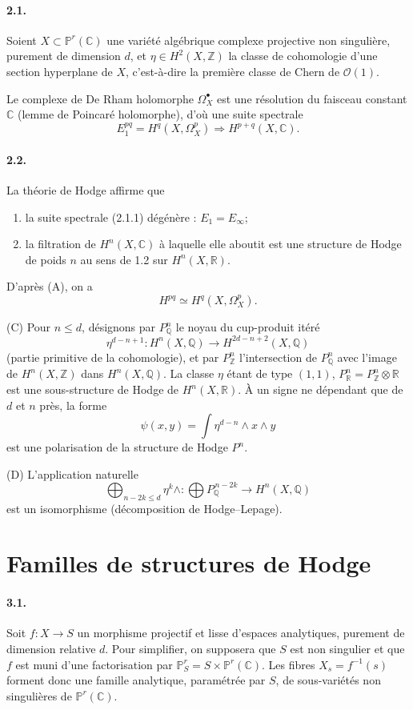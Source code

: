 \documentclass[10pt]{article}
\newcommand{\C}{\mathbb C}
\newcommand{\R}{\mathbb R}
\newcommand{\Z}{\mathbb Z}
\newcommand{\Q}{\mathbb Q}
\newcommand{\Pj}{\mathbb P}
\newcommand{\cO}{\mathcal O}
\theoremstyle{deligne}
\begin{document}
\paragraph{2.1.}
Soient $X\subset\Pj^r(\C)$ une variété algébrique complexe projective non singulière, purement de dimension $d$, et $\eta\in H^2(X,\Z)$ la classe de cohomologie d'une section hyperplane de $X$, c'est-à-dire la première classe de Chern de $\cO(1)$.

Le complexe de De Rham holomorphe $\Omega_X^\bullet$ est une résolution du faisceau constant $\C$ (lemme de Poincaré holomorphe), d'où une suite spectrale
\begin{equation}
E_1^{pq}=H^q(X,\Omega_X^p)\Rightarrow H^{p+q}(X,\C).
\tag{2.1.1}
\end{equation}

\paragraph{2.2.}
La théorie de Hodge affirme que
\begin{enumerate}[label=(\Alph*)]
\item la suite spectrale (2.1.1) dégénère : $E_1=E_\infty$;
\item la filtration de $H^n(X,\C)$ à laquelle elle aboutit est une structure de Hodge de poids $n$ au sens de 1.2 sur $H^n(X,\R)$.
\end{enumerate}
D'après (A), on a
\[
H^{pq}\simeq H^q(X,\Omega_X^p).
\]

(C) Pour $n\le d$, désignons par $P_\Q^n$ le noyau du cup-produit itéré
\[
\eta^{d-n+1}:H^n(X,\Q)\longrightarrow H^{2d-n+2}(X,\Q)
\]
(partie primitive de la cohomologie), et par $P_\Z^n$ l'intersection de $P_\Q^n$ avec l'image de $H^n(X,\Z)$ dans $H^n(X,\Q)$. La classe $\eta$ étant de type $(1,1)$, $P_\R^n=P_\Z^n\otimes\R$ est une sous-structure de Hodge de $H^n(X,\R)$. À un signe ne dépendant que de $d$ et $n$ près, la forme
\[
\psi(x,y)=\int \eta^{d-n}\wedge x\wedge y
\]
est une polarisation de la structure de Hodge $P^n$.

(D) L'application naturelle
\[
\bigoplus_{n-2k\le d}\eta^k\wedge:
\bigoplus P_\Q^{\,n-2k}\longrightarrow H^n(X,\Q)
\]
est un isomorphisme (décomposition de Hodge--Lepage).

\section{Familles de structures de Hodge}

\paragraph{3.1.}
Soit $f:X\to S$ un morphisme projectif et lisse d'espaces analytiques, purement de dimension relative $d$. Pour simplifier, on supposera que $S$ est non singulier et que $f$ est muni d'une factorisation par $\Pj^r_S=S\times\Pj^r(\C)$. Les fibres $X_s=f^{-1}(s)$ forment donc une famille analytique, paramétrée par $S$, de sous-variétés non singulières de $\Pj^r(\C)$.
\end{document}
